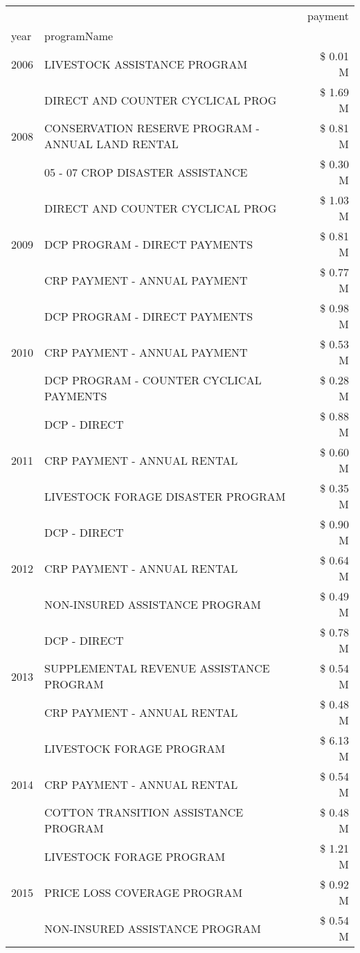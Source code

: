\begin{tabular}{llr}
\toprule
 &  & payment \\
year & programName &  \\
\midrule
2006 & LIVESTOCK ASSISTANCE PROGRAM & \$ 0.01 M \\
\cline{1-3}
\multirow[t]{3}{*}{2008} & DIRECT AND COUNTER CYCLICAL PROG & \$ 1.69 M \\
 & CONSERVATION RESERVE PROGRAM - ANNUAL LAND RENTAL & \$ 0.81 M \\
 & 05 - 07 CROP DISASTER ASSISTANCE & \$ 0.30 M \\
\cline{1-3}
\multirow[t]{3}{*}{2009} & DIRECT AND COUNTER CYCLICAL PROG & \$ 1.03 M \\
 & DCP PROGRAM - DIRECT PAYMENTS & \$ 0.81 M \\
 & CRP PAYMENT - ANNUAL PAYMENT & \$ 0.77 M \\
\cline{1-3}
\multirow[t]{3}{*}{2010} & DCP PROGRAM - DIRECT PAYMENTS & \$ 0.98 M \\
 & CRP PAYMENT - ANNUAL PAYMENT & \$ 0.53 M \\
 & DCP PROGRAM - COUNTER CYCLICAL PAYMENTS & \$ 0.28 M \\
\cline{1-3}
\multirow[t]{3}{*}{2011} & DCP - DIRECT & \$ 0.88 M \\
 & CRP PAYMENT - ANNUAL RENTAL & \$ 0.60 M \\
 & LIVESTOCK FORAGE DISASTER PROGRAM & \$ 0.35 M \\
\cline{1-3}
\multirow[t]{3}{*}{2012} & DCP - DIRECT & \$ 0.90 M \\
 & CRP PAYMENT - ANNUAL RENTAL & \$ 0.64 M \\
 & NON-INSURED ASSISTANCE PROGRAM & \$ 0.49 M \\
\cline{1-3}
\multirow[t]{3}{*}{2013} & DCP - DIRECT & \$ 0.78 M \\
 & SUPPLEMENTAL REVENUE ASSISTANCE PROGRAM & \$ 0.54 M \\
 & CRP PAYMENT - ANNUAL RENTAL & \$ 0.48 M \\
\cline{1-3}
\multirow[t]{3}{*}{2014} & LIVESTOCK FORAGE PROGRAM & \$ 6.13 M \\
 & CRP PAYMENT - ANNUAL RENTAL & \$ 0.54 M \\
 & COTTON TRANSITION ASSISTANCE PROGRAM & \$ 0.48 M \\
\cline{1-3}
\multirow[t]{3}{*}{2015} & LIVESTOCK FORAGE PROGRAM & \$ 1.21 M \\
 & PRICE LOSS COVERAGE PROGRAM & \$ 0.92 M \\
 & NON-INSURED ASSISTANCE PROGRAM & \$ 0.54 M \\

\end{tabular}
